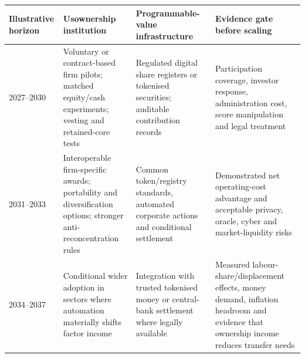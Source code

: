 \begin{tabularx}{\linewidth}{@{}p{.16\linewidth}p{.27\linewidth}p{.31\linewidth}X@{}}
\toprule
Illustrative horizon & Usownership institution & Programmable-value infrastructure & Evidence gate before scaling \\
\midrule
2027--2030 & Voluntary or contract-based firm pilots; matched equity/cash experiments; vesting and retained-core tests & Regulated digital share registers or tokenised securities; auditable contribution records & Participation coverage, investor response, administration cost, score manipulation and legal treatment \\
2031--2033 & Interoperable firm-specific awards; portability and diversification options; stronger anti-reconcentration rules & Common token/registry standards, automated corporate actions and conditional settlement & Demonstrated net operating-cost advantage and acceptable privacy, oracle, cyber and market-liquidity risks \\
2034--2037 & Conditional wider adoption in sectors where automation materially shifts factor income & Integration with trusted tokenised money or central-bank settlement where legally available & Measured labour-share/displacement effects, money demand, inflation headroom and evidence that ownership income reduces transfer needs \\
\bottomrule
\end{tabularx}
